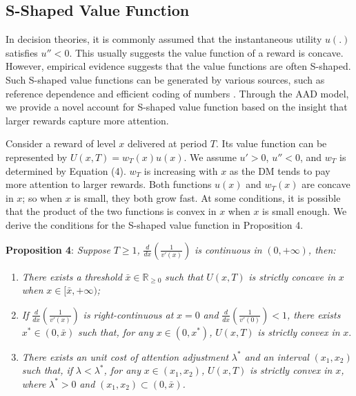 \documentclass[
  12pt,
]{article}
\begin{document}
\hypertarget{s-shaped-value-function}{%
\subsection{\texorpdfstring{S-Shaped Value Function
\label{s_shape_value}}{S-Shaped Value Function }}\label{s-shaped-value-function}}

In decision theories, it is commonly assumed that the instantaneous
utility \(u(.)\) satisfies \(u''<0\). This usually suggests the value
function of a reward is concave. However, empirical evidence suggests
that the value functions are often S-shaped. Such S-shaped value
functions can be generated by various sources, such as reference
dependence \citep{kahneman1979prospect} and efficient coding of numbers
\citep{louie2012efficient}. Through the AAD model, we provide a novel
account for S-shaped value function based on the insight that larger
rewards capture more attention.

Consider a reward of level \(x\) delivered at period \(T\). Its value
function can be represented by \(U(x,T)=w_T(x)u(x)\). We assume
\(u'>0\), \(u''<0\), and \(w_T\) is determined by Equation (4). \(w_T\)
is increasing with \(x\) as the DM tends to pay more attention to larger
rewards. Both functions \(u(x)\) and \(w_T(x)\) are concave in \(x\); so
when \(x\) is small, they both grow fast. At some conditions, it is
possible that the product of the two functions is convex in \(x\) when
\(x\) is small enough. We derive the conditions for the S-shaped value
function in Proposition 4.

\noindent \textbf{Proposition 4}: \emph{Suppose} \(T\geq1\)\emph{,}
\(\frac{d}{dx}\left(\frac{1}{v'(x)}\right)\) \emph{is continuous in}
\((0,+\infty)\)\emph{, then:}

\begin{enumerate}
\def\labelenumi{(\alph{enumi})}
\item
  \emph{There exists a threshold} \(\bar{x} \in\mathbb{R}_{\geq0}\)
  \emph{such that} \(U(x,T)\) \emph{is strictly concave in} \(x\)
  \emph{when} \(x\in [\bar{x},+\infty)\)\emph{;}
\item
  \emph{If} \(\frac{d}{dx}\left(\frac{1}{v'(x)}\right)\) \emph{is
  right-continuous at} \(x=0\) \emph{and}
  \(\frac{d}{dx}\left(\frac{1}{v'(0)}\right)<1\)\emph{, there exists}
  \(x^*\in(0, \bar{x})\) \emph{such that, for any}
  \(x\in (0,x^*)\)\emph{,} \(U(x,T)\) \emph{is strictly convex in}
  \(x\).
\item
  \emph{There exists an unit cost of attention adjustment} \(\lambda^*\)
  \emph{and an interval} \((x_1,x_2)\) \emph{such that, if}
  \(\lambda<\lambda^*\)\emph{, for any} \(x\in(x_1,x_2)\)\emph{,}
  \(U(x,T)\) \emph{is strictly convex in} \(x\)\emph{, where}
  \(\lambda^*>0\) \emph{and} \((x_1,x_2)\subset(0,\bar{x})\)\emph{.}
\end{enumerate}
\end{document}
